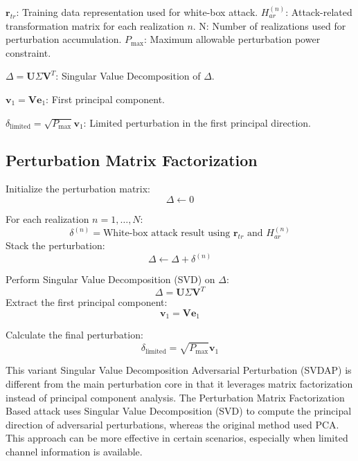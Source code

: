 $\mathbf{r}_{tr}$: Training data representation used for white-box attack.  
$H^{(n)}_{ar}$: Attack-related transformation matrix for each realization $n$.  
N: Number of realizations used for perturbation accumulation.  
$P_{\text{max}}$: Maximum allowable perturbation power constraint.


$\Delta = \mathbf{U} \Sigma \mathbf{V}^T$: Singular Value Decomposition of $\Delta$.

$\mathbf{v}_1 = \mathbf{V}\mathbf{e}_1$: First principal component.

$\delta_{\text{limited}} = \sqrt{P_{\text{max}}} \mathbf{v}_1$: Limited perturbation in the first principal direction.

\subsection*{Perturbation Matrix Factorization}

Initialize the perturbation matrix:
\[
\Delta \leftarrow 0
\]

For each realization $n = 1, \ldots, N$:
\[
\delta^{(n)} = \text{White-box attack result using } \mathbf{r}_{tr} \text{ and } H^{(n)}_{ar}
\]
Stack the perturbation:
\[
\Delta \leftarrow \Delta + \delta^{(n)}
\]

Perform Singular Value Decomposition (SVD) on $\Delta$:
\[
\Delta = \mathbf{U} \Sigma \mathbf{V}^T
\]
Extract the first principal component:
\[
\mathbf{v}_1 = \mathbf{V} \mathbf{e}_1
\]

Calculate the final perturbation:
\[
\delta_{\text{limited}} = \sqrt{P_{\text{max}}} \mathbf{v}_1
\]

This variant Singular Value Decomposition Adversarial Perturbation (SVDAP) is different from the main perturbation core in that it leverages matrix factorization instead of principal component analysis. The Perturbation Matrix Factorization Based attack uses Singular Value Decomposition (SVD) to compute the principal direction of adversarial perturbations, whereas the original method used PCA. This approach can be more effective in certain scenarios, especially when limited channel information is available.